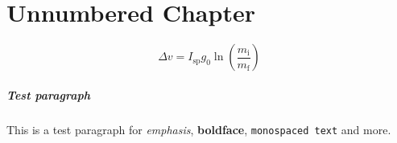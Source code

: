 \chapter*{Unnumbered Chapter}

    \lipsum[1-2]
    \begin{equation}
        \Delta v = I_\text{sp}g_0\ln{\left(\frac{m_\text{i}}{m_\text{f}}\right)}
    \end{equation}

    \paragraph{Test paragraph} This is a test paragraph for \emph{emphasis}, \textbf{boldface}, \texttt{monospaced text} and more.